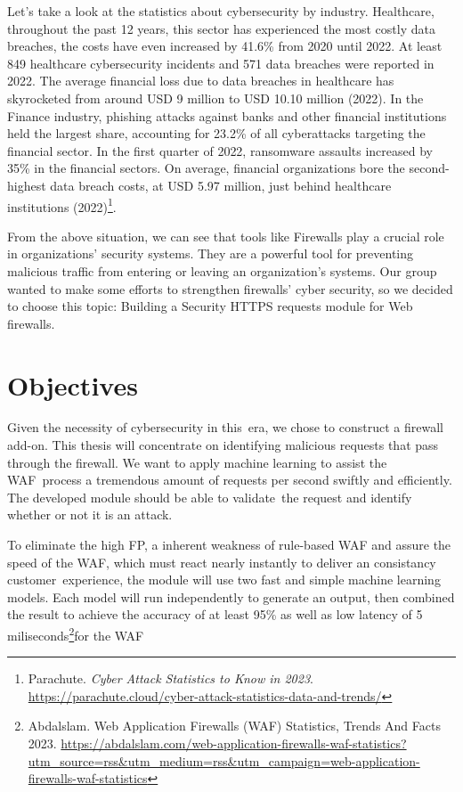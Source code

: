 Let's take a look at the statistics about cybersecurity by industry. Healthcare, throughout the past 12 years, this sector has experienced the most costly data breaches, the costs have even increased by 41.6\% from 2020 until 2022. At least 849 healthcare cybersecurity incidents and 571 data breaches were reported in 2022. The average financial loss due to data breaches in healthcare has skyrocketed from around USD 9 million to USD 10.10 million (2022). In the Finance industry, phishing attacks against banks and other financial institutions held the largest share, accounting for 23.2\% of all cyberattacks targeting the financial sector. In the first quarter of 2022, ransomware assaults increased by 35\% in the financial sectors. On average, financial organizations bore the second-highest data breach costs, at USD 5.97 million, just behind healthcare institutions (2022)\footnote{Parachute. \textit{Cyber Attack Statistics to Know in 2023}. \url{https://parachute.cloud/cyber-attack-statistics-data-and-trends/}}. 

From the above situation, we can see that tools like Firewalls play a crucial role in organizations' security systems. They are a powerful tool for preventing malicious traffic from entering or leaving an organization’s systems. Our group wanted to make some efforts to strengthen firewalls' cyber security, so we decided to choose this topic: Building a Security HTTPS requests module for Web firewalls.
\section{Objectives}
\label{sec:objectives}
Given the necessity of cybersecurity in this era, we chose to construct a firewall add-on. This thesis will concentrate on identifying malicious requests that pass through the firewall. We want to apply machine learning to assist the WAF process a tremendous amount of requests per second swiftly and efficiently. The developed module should be able to validate the request and identify whether or not it is an attack.

To eliminate the high FP, a inherent weakness of rule-based WAF and assure the speed of the WAF, which must react nearly instantly to deliver an consistancy customer experience, the module will use two fast and simple machine learning models. Each model will run independently to generate an output, then combined the result to achieve the accuracy of at least 95\% as well as low latency of 5 miliseconds\footnote{Abdalslam. Web Application Firewalls (WAF) Statistics, Trends And Facts 2023. \url{https://abdalslam.com/web-application-firewalls-waf-statistics?utm_source=rss&utm_medium=rss&utm_campaign=web-application-firewalls-waf-statistics}}for the WAF

